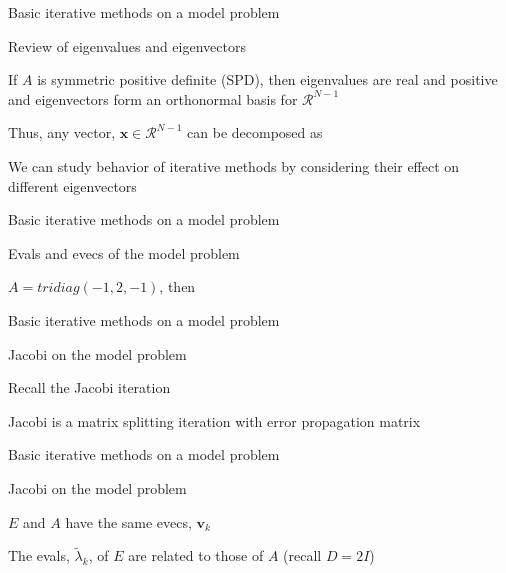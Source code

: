\documentclass[18pt,xcolor=table]{beamer}
\begin{document}
\begin{frame}{Basic iterative methods on a model problem}
\begin{block}{Review of eigenvalues and eigenvectors}
\bit
\item If $A$ is symmetric positive definite (SPD), then eigenvalues are real and positive and eigenvectors form an orthonormal basis for $\mathcal{R}^{N-1}$
\item Thus, any vector, $\mathbf{x}\in\mathcal{R}^{N-1}$ can be decomposed as 
\item We can study behavior of iterative methods by considering their effect on different eigenvectors
\eit
\end{block}
\end{frame}

\begin{frame}{Basic iterative methods on a model problem}
\begin{block}{Evals and evecs of the model problem}
\bit
\item $A = tridiag(-1,2,-1)$, then
\eit
\end{block}
\end{frame}

\begin{frame}{Basic iterative methods on a model problem}
\begin{block}{Jacobi on the model problem}
\bit
\item Recall the Jacobi iteration
\item Jacobi is a matrix splitting iteration with error propagation matrix
\eit
\end{block}
\end{frame}

\begin{frame}{Basic iterative methods on a model problem}
\begin{block}{Jacobi on the model problem}
\bit
\item $E$ and $A$ have the same evecs, $\mathbf{v}_k$
\item The evals, $\tilde\lambda_k$, of $E$ are related to those of $A$ (recall $D = 2I$)
\eit
\end{block}
\end{frame}
\end{document}
